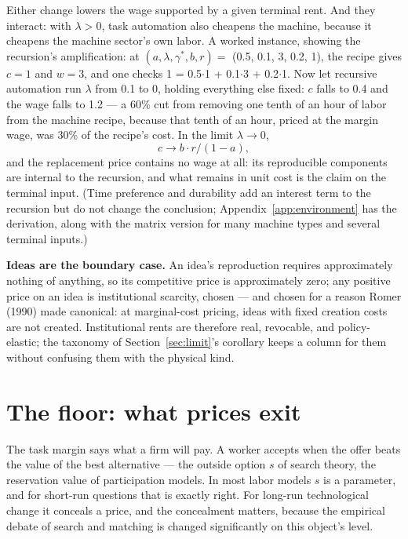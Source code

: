 \documentclass[12pt]{article}
\theoremstyle{plain}
\begin{document}
Either change lowers the wage supported by a given terminal rent. And they interact: with $\lambda > 0$, task automation also cheapens the machine, because it cheapens the machine sector's own labor. A worked instance, showing the recursion's amplification: at $(a, \lambda , \gamma ^*, b, r) =$ (0.5, 0.1, 3, 0.2, 1), the recipe gives $c = 1$ and $w = 3$, and one checks 1 = 0.5$\cdot$1 + 0.1$\cdot$3 + 0.2$\cdot$1. Now let recursive automation run $\lambda$ from 0.1 to 0, holding everything else fixed: $c$ falls to 0.4 and the wage falls to 1.2 --- a 60\% cut from removing one tenth of an hour of labor from the machine recipe, because that tenth of an hour, priced at the margin wage, was 30\% of the recipe's cost. In the limit $\lambda \to 0$,
\begin{equation}\label{eq:lambda-zero}
c \to b\cdot r/(1 - a),
\end{equation}
and the replacement price contains no wage at all: its reproducible components are internal to the recursion, and what remains in unit cost is the claim on the terminal input. (Time preference and durability add an interest term to the recursion but do not change the conclusion; Appendix~\ref{app:environment} has the derivation, along with the matrix version for many machine types and several terminal inputs.)

\textbf{Ideas are the boundary case.} An idea's reproduction requires approximately nothing of anything, so its competitive price is approximately zero; any positive price on an idea is institutional scarcity, chosen --- and chosen for a reason Romer (1990) made canonical: at marginal-cost pricing, ideas with fixed creation costs are not created. Institutional rents are therefore real, revocable, and policy-elastic; the taxonomy of Section~\ref{sec:limit}'s corollary keeps a column for them without confusing them with the physical kind.

\section{The floor: what prices exit}\label{sec:floor}

The task margin says what a firm will pay. A worker accepts when the offer beats the value of the best alternative --- the outside option $s$ of search theory, the reservation value of participation models. In most labor models $s$ is a parameter, and for short-run questions that is exactly right. For long-run technological change it conceals a price, and the concealment matters, because the empirical debate of search and matching is changed significantly on this object's level.
\end{document}
